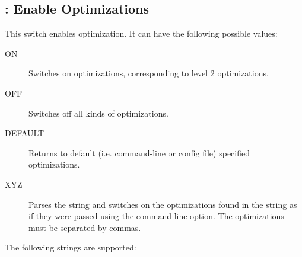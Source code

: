 \subsection{ : Enable Optimizations}
\label{switch:optimization}
This switch enables optimization. It can have the following possible values:
\begin{description}
\item[ON] Switches on optimizations, corresponding to level 2 optimizations.
\item[OFF] Switches off all kinds of optimizations.
\item[DEFAULT] Returns to default (i.e. command-line or config file) specified optimizations.
\item[XYZ] Parses the string and switches on the optimizations found in the
string as if they were passed using the  command line option.
The optimizations must be separated by commas.
\end{description}
The following strings are supported:
